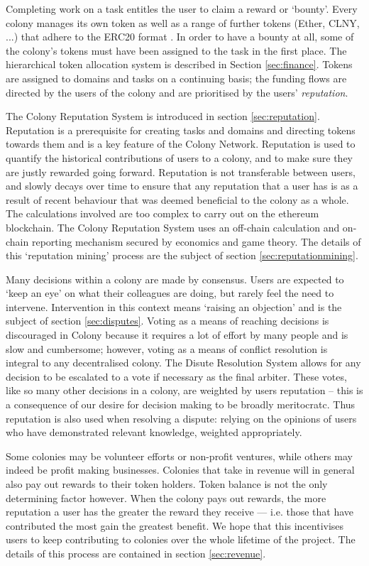Completing work on a task entitles the user to claim a reward or `bounty'. Every colony manages its own token as well as a range of further tokens (Ether, CLNY, ...) that adhere to the ERC20 format \cite{erc20}. In order to have a bounty at all, some of the colony's tokens must have been assigned to the task in the first place. The hierarchical token allocation system is described in Section \ref{sec:finance}. Tokens are assigned to domains and tasks on a continuing basis; the funding flows are directed by the users of the colony and are prioritised by the users' \emph{reputation}. 

The Colony Reputation System is introduced in section \ref{sec:reputation}. Reputation is a prerequisite for creating tasks and domains and directing tokens towards them and is a key feature of the Colony Network. Reputation is used to quantify the historical contributions of users to a colony, and to make sure they are justly rewarded going forward. Reputation is not transferable between users, and slowly decays over time to ensure that any reputation that a user has is as a result of recent behaviour that was deemed beneficial to the colony as a whole. The calculations involved are too complex to carry out on the ethereum blockchain. The Colony Reputation System uses an off-chain calculation and on-chain reporting mechanism secured by economics and game theory. The details of this `reputation mining' process are the subject of section \ref{sec:reputationmining}.

Many decisions within a colony are made by consensus. Users are expected to `keep an eye' on what their colleagues are doing, but rarely feel the need to intervene. Intervention in this context means `raising an objection' and is the subject of section \ref{sec:disputes}. Voting as a means of reaching decisions is discouraged in Colony because it requires a lot of effort by many people and is slow and cumbersome; however, voting as a means of conflict resolution is integral to any decentralised colony. The Disute Resolution System allows for any decision to be escalated to a vote if necessary as the final arbiter. These votes, like so many other decisions in a colony, are weighted by users reputation -- this is a consequence of our desire for decision making to be broadly meritocratc. Thus  reputation is also used when resolving a dispute: relying on the opinions of users who have demonstrated relevant knowledge, weighted appropriately. 

Some colonies may be volunteer efforts or non-profit ventures, while others may indeed be profit making businesses. Colonies that take in revenue will in general also pay out rewards to their token holders. Token balance is not the only determining factor however. When the colony pays out rewards, the more reputation a user has the greater the reward they receive --- i.e. those that have contributed the most gain the greatest benefit. We hope that this incentivises users to keep contributing to colonies over the whole lifetime of the project. The details of this process are contained in section \ref{sec:revenue}.
